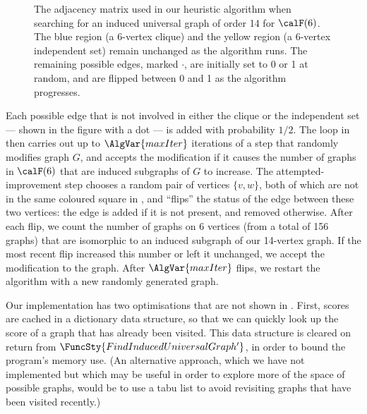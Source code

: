 \begin{figure}[h!]
    \centering
    \footnotesize
    \caption{The adjacency matrix used in our heuristic algorithm when searching
        for an induced universal graph of order 14 for $\calF(6)$.  The blue
        region (a 6-vertex clique) and the yellow region (a 6-vertex independent
        set) remain unchanged as the algorithm runs.  The remaining possible edges,
        marked $\boldsymbol{\cdot}$, are initially set to 0 or 1 at random,
        and are flipped between 0 and 1 as the algorithm progresses.}
\label{fig:heuristic-regions}
\end{figure}

Each possible edge that is not involved in either the clique or the independent
set --- shown in the figure with a dot --- is added with probability $1/2$.
The loop in  then carries out up to
$\AlgVar{maxIter}$ iterations of a step that randomly modifies graph $G$,
and accepts the modification if it causes the number of graphs in $\calF(6)$ that
are induced subgraphs of $G$ to increase.
The attempted-improvement step chooses a random pair of vertices $\{v, w\}$,
both of which are not in the same coloured square
in , and
``flips'' the status of the edge between these two vertices: the edge is added if it
is not present, and removed otherwise.
After each flip, we count the number of graphs on 6 vertices (from a total
of 156 graphs) that are
isomorphic to an induced subgraph of our 14-vertex graph.  If the most recent flip
increased this number or left it unchanged, we accept the modification
to the graph.  After $\AlgVar{maxIter}$
flips, we restart the algorithm with a new randomly generated graph.

Our implementation has two optimisations that are not shown in .
First, scores are cached in a dictionary data structure, so that we can quickly look
up the score of a graph that has already been visited. This data structure is
cleared on return from $\FuncSty{FindInducedUniversalGraph'}$, in order to
bound the program's memory use.
(An alternative approach, which we have not implemented but which
may be useful in order to explore more of the space of possible graphs, would be to
use a tabu list \citep{DBLP:books/daglib/0093574} to avoid revisiting graphs
that have been visited recently.)

